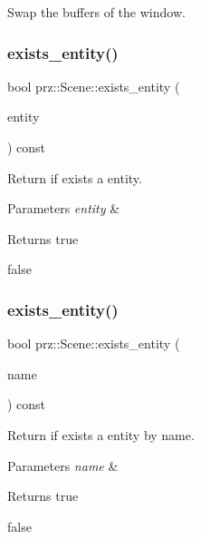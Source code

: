 Swap the buffers of the window. 

\mbox{\label{classprz_1_1_scene_aa3c59d6b9df4fb911fce48003a6f945b}} 
\subsubsection{\texorpdfstring{exists\_entity()}{exists\_entity()}\hspace{0.1cm}{\footnotesize\ttfamily [1/2]}}
{\footnotesize\ttfamily bool prz\+::\+Scene\+::exists\+\_\+entity (\begin{DoxyParamCaption}\item[{P\+S\+Ptr$<$ \mbox{\hyperlink{classprz_1_1_entity}{Entity}} $>$}]{entity }\end{DoxyParamCaption}) const}



Return if exists a entity. 


\begin{DoxyParams}{Parameters}
{\em entity} & \\
\hline
\end{DoxyParams}
\begin{DoxyReturn}{Returns}
true 

false 
\end{DoxyReturn}
\mbox{\label{classprz_1_1_scene_abd37a8193847977ecf5f6352aaa77042}} 
\subsubsection{\texorpdfstring{exists\_entity()}{exists\_entity()}\hspace{0.1cm}{\footnotesize\ttfamily [2/2]}}
{\footnotesize\ttfamily bool prz\+::\+Scene\+::exists\+\_\+entity (\begin{DoxyParamCaption}\item[{const P\+String \&}]{name }\end{DoxyParamCaption}) const\hspace{0.3cm}{\ttfamily [inline]}}



Return if exists a entity by name. 


\begin{DoxyParams}{Parameters}
{\em name} & \\
\hline
\end{DoxyParams}
\begin{DoxyReturn}{Returns}
true 

false 
\end{DoxyReturn}
\mbox{\label{classprz_1_1_scene_aba275583269ef775fd5d75777a5b33fb}} 
